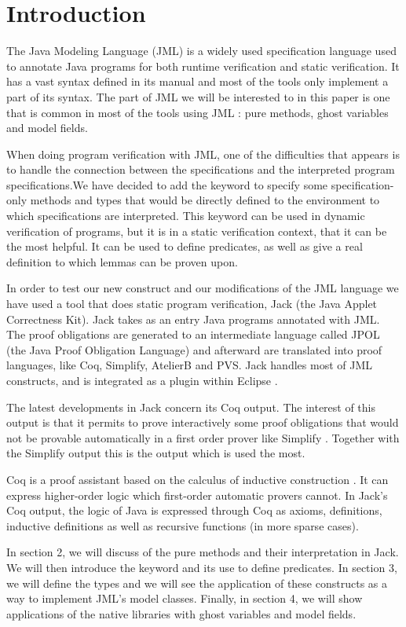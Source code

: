 
\section{Introduction}
The Java Modeling Language (JML) is a widely used specification language 
used to annotate Java programs for both runtime verification and static 
verification. It has a vast syntax defined in its manual and most of the 
tools only implement a part of its syntax. The part of JML we will be 
interested to in this paper is one that is common in most of the tools 
using JML \cite{BurdyEtAl05:STTT}: pure methods, ghost variables and  
model fields. 

When doing program verification with JML, one of the difficulties that appears
is to handle the connection between the specifications and the interpreted 
program specifications.We have decided to add the keyword 
to specify some specification-only methods and types that would be 
directly defined to the environment to which specifications are interpreted. 
This keyword can be used in dynamic verification of programs, 
but it is in a static verification context, that it can be the most helpful.
It can be used to define predicates, as well as give a real definition 
to which lemmas can be proven upon.

In order to test our new construct and our modifications of the JML language 
we have used a tool that does static program verification,  Jack 
(the Java Applet Correctness Kit)\cite{BRL-03-JACK,Jack-Web}. 
Jack takes as an entry Java programs annotated with JML. 
The proof obligations are generated to an intermediate language called JPOL 
(the Java Proof Obligation Language) and afterward are translated into 
proof languages, like Coq, Simplify, AtelierB and PVS. 
Jack handles most of JML constructs, and is integrated as a plugin within 
Eclipse \cite{Eclipse-Web}.

The latest developments in Jack concern its Coq output. 
The interest of this output is that it permits to prove interactively some 
proof obligations that would not be provable automatically in a first order 
prover like Simplify \cite{simplify}.
Together with the Simplify output this is the output which is used the most.

Coq is a proof assistant based on the calculus of inductive construction 
\cite{BC-04-COQ}. 
It can express 
higher-order logic which first-order automatic provers cannot. In Jack's Coq 
output, the logic of Java is  expressed through Coq as axioms, definitions, 
inductive definitions as well as recursive 
functions (in more sparse cases).

In section 2,  we will discuss of the pure methods and their interpretation 
in Jack. We will then introduce
the  keyword and its use to define predicates.
In section 3, we will define the  types and we will see the 
application of these constructs 
as a way to implement JML's model classes.
Finally, in section 4, we will show applications of the native libraries with 
 ghost variables and model fields.
